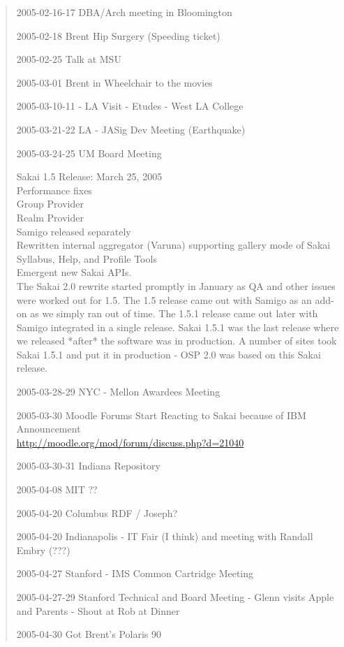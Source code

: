 \begin{quote}
2005-02-16-17 DBA/Arch meeting in Bloomington

2005-02-18 Brent Hip Surgery (Speeding ticket)

2005-02-25 Talk at MSU

2005-03-01 Brent in Wheelchair to the movies

2005-03-10-11 - LA Visit - Etudes - West LA College

2005-03-21-22 LA - JASig Dev Meeting (Earthquake)

2005-03-24-25 UM Board Meeting

Sakai 1.5 Release: March 25, 2005\\
Performance fixes\\
Group Provider\\
Realm Provider\\
Samigo released separately\\
Rewritten internal aggregator (Varuna) supporting gallery mode of Sakai\\
Syllabus, Help, and Profile Tools\\
Emergent new Sakai APIs.\\

The Sakai 2.0 rewrite started promptly in January as QA and other issues were worked out for 1.5.  The 1.5 release came out with Samigo as an add-on as we simply ran out of time.  The 1.5.1 release came out later with Samigo integrated in a single release.  Sakai 1.5.1 was the last release where we released *after* the software was in production.  A number of sites took Sakai 1.5.1 and put it in production - OSP 2.0 was based on this Sakai release.

2005-03-28-29 NYC - Mellon Awardees Meeting

2005-03-30 Moodle Forums Start Reacting to Sakai because of IBM Announcement\\
\url{http://moodle.org/mod/forum/discuss.php?d=21040}

2005-03-30-31 Indiana Repository

2005-04-08  MIT ??

2005-04-20 Columbus RDF / Joseph?

2005-04-20 Indianapolis - IT Fair (I think) and meeting with Randall Embry (???)

2005-04-27 Stanford - IMS Common Cartridge Meeting

2005-04-27-29 Stanford Technical and Board Meeting - Glenn visits Apple and Parents - Shout at Rob at Dinner

2005-04-30 Got Brent's Polaris 90


\end{quote}
